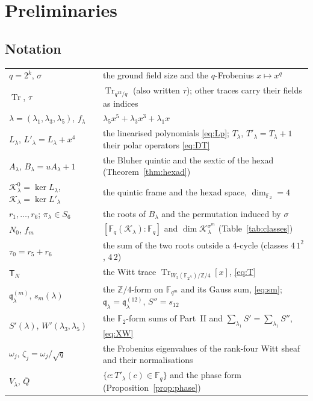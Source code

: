 ﻿\documentclass[12pt,a4paper]{amsart}
\theoremstyle{definition}
\newcommand{\F}{\mathbb{F}}
\newcommand{\Z}{\mathbb{Z}}
\newcommand{\Tr}{\operatorname{Tr}}
\newcommand{\Kk}{\mathcal{K}}
\newcommand{\qq}{\mathfrak{q}}
\newcommand{\Spp}{S''}
\begin{document}
\section{Preliminaries}\label{sec:prelim}

\subsection{Notation}
\begin{center}\small
\begin{tabular}{@{}p{}p{}@{}}
\toprule
$q=2^k$, $\sigma$ & the ground field size and the $q$-Frobenius $x\mapsto x^q$\\
$\Tr$, $\tau$ & $\Tr_{q^{12}/q}$ (also written $\tau$); other traces carry their fields as indices\\
$\lambda=(\lambda_1,\lambda_3,\lambda_5)$, $f_\lambda$ & $\lambda_5x^5+\lambda_3x^3+\lambda_1x$\\
$L_\lambda$, $L'_\lambda=L_\lambda+x^4$ & the linearised polynomials \eqref{eq:Lp}; $T_\lambda$, $T'_\lambda=T_\lambda+1$ their polar operators \eqref{eq:DT}\\
$A_\lambda$, $B_\lambda=uA_\lambda+1$ & the Bluher quintic and the sextic of the hexad (Theorem~\ref{thm:hexad})\\
$\Kk^0_\lambda=\ker L_\lambda$, $\Kk_\lambda=\ker L'_\lambda$ & the quintic frame and the hexad space, $\dim_{\F_2}=4$\\
$r_1,\dots,r_6$; $\pi_\lambda\in S_6$ & the roots of $B_\lambda$ and the permutation induced by $\sigma$\\
$N_0$, $f_m$ & $[\F_q(\Kk_\lambda):\F_q]$ and $\dim\Kk_\lambda^{\sigma^m}$ (Table~\ref{tab:classes})\\
$\tau_0=r_5+r_6$ & the sum of the two roots outside a $4$-cycle (classes $4\,1^2$, $4\,2$)\\
$\mathsf T_N$ & the Witt trace $\Tr_{W_2(\F_{2^N})/\Z/4}[x]$, \eqref{eq:T}\\
$\qq^{(m)}_\lambda$, $s_m(\lambda)$ & the $\Z/4$-form on $\F_{q^m}$ and its Gauss sum, \eqref{eq:sm}; $\qq_\lambda=\qq^{(12)}_\lambda$, $\Spp=s_{12}$\\
$S'(\lambda)$, $W'(\lambda_3,\lambda_5)$ & the $\F_2$-form sums of Part~II and $\sum_{\lambda_1}S'=\sum_{\lambda_1}\Spp$, \eqref{eq:XW}\\
$\omega_j$, $\zeta_j=\omega_j/\sqrt q$ & the Frobenius eigenvalues of the rank-four Witt sheaf and their normalisations\\
$V_\lambda$, $\bar Q$ & $\{c:T'_\lambda(c)\in\F_q\}$ and the phase form (Proposition~\ref{prop:phase})\\
\bottomrule
\end{tabular}
\end{center}
\end{document}
